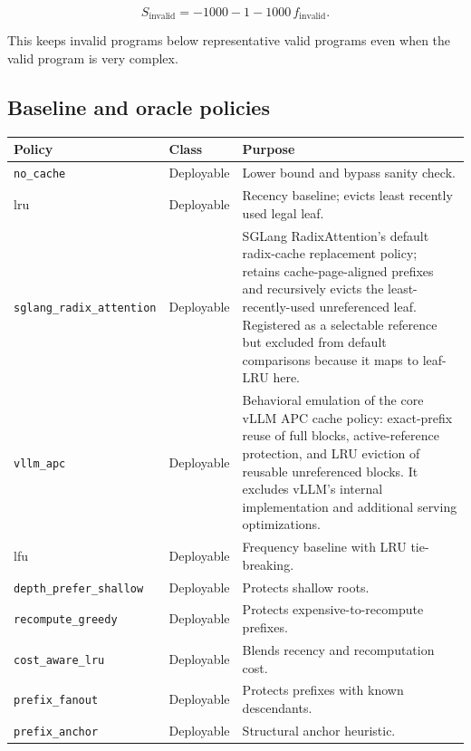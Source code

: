 \documentclass[11pt]{article}
\newcommand{\identifier}[1]{\nolinkurl{#1}}
\begin{document}
\begin{equation}
  S_{\text{invalid}} =
  -1000 - 1 - 1000\,f_{\text{invalid}}.
\end{equation}

This keeps invalid programs below representative valid programs even when the valid
program is very complex.

\subsection{Baseline and oracle policies}

\begin{longtable}{>{\ttfamily}p{}
                  >{\raggedright\arraybackslash}p{}
                  >{\raggedright\arraybackslash}p{}}
\toprule
\normalfont\textbf{Policy} & \textbf{Class} & \textbf{Purpose} \\
\midrule
\endhead
\identifier{no_cache} & Deployable & Lower bound and bypass sanity check. \\
lru & Deployable & Recency baseline; evicts least recently used legal leaf. \\
\identifier{sglang_radix_attention} & Deployable & SGLang RadixAttention's default
radix-cache replacement policy; retains cache-page-aligned prefixes and recursively
evicts the least-recently-used unreferenced leaf.  Registered as a selectable
reference but excluded from default comparisons because it maps to leaf-LRU here. \\
\identifier{vllm_apc} & Deployable & Behavioral emulation of the core vLLM APC cache
policy: exact-prefix reuse of full blocks, active-reference protection, and LRU
eviction of reusable unreferenced blocks.  It excludes vLLM's internal implementation
and additional serving optimizations. \\
lfu & Deployable & Frequency baseline with LRU tie-breaking. \\
\identifier{depth_prefer_shallow} & Deployable & Protects shallow roots. \\
\identifier{recompute_greedy} & Deployable & Protects expensive-to-recompute prefixes. \\
\identifier{cost_aware_lru} & Deployable & Blends recency and recomputation cost. \\
\identifier{prefix_fanout} & Deployable & Protects prefixes with known descendants. \\
\identifier{prefix_anchor} & Deployable & Structural anchor heuristic. \\

\end{longtable}
\end{document}
